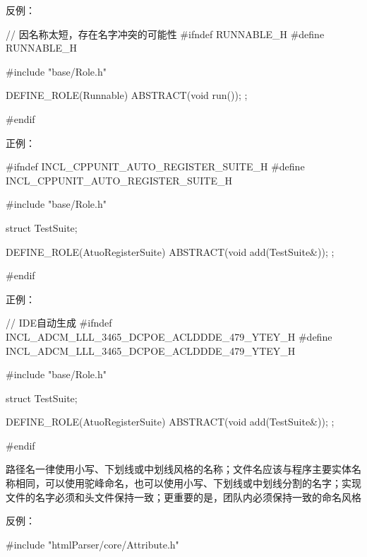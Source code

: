 \begin{content}
反例：
\begin{leftbar}
\begin{c++}[caption={thread/Runnable.h}]
// 因名称太短，存在名字冲突的可能性
#ifndef RUNNABLE_H
#define RUNNABLE_H

#include "base/Role.h"

DEFINE_ROLE(Runnable)
{
    ABSTRACT(void run());
};

#endif
\end{c++}
\end{leftbar}

正例：
\begin{leftbar}
\begin{c++}[caption={cppunit/AutoRegisterSuite.h}]
#ifndef INCL_CPPUNIT_AUTO_REGISTER_SUITE_H
#define INCL_CPPUNIT_AUTO_REGISTER_SUITE_H

#include "base/Role.h"

struct TestSuite;

DEFINE_ROLE(AtuoRegisterSuite)
{
    ABSTRACT(void add(TestSuite&));
};

#endif
\end{c++}
\end{leftbar}

正例：
\begin{leftbar}
\begin{c++}[caption={cppunit/AutoRegisterSuite.h}]
// IDE自动生成
#ifndef INCL_ADCM_LLL_3465_DCPOE_ACLDDDE_479_YTEY_H
#define INCL_ADCM_LLL_3465_DCPOE_ACLDDDE_479_YTEY_H

#include "base/Role.h"

struct TestSuite;

DEFINE_ROLE(AtuoRegisterSuite)
{
    ABSTRACT(void add(TestSuite&));
};

#endif
\end{c++}
\end{leftbar}

\begin{regulation}
路径名一律使用小写、下划线或中划线风格的名称；文件名应该与程序主要实体名称相同，可以使用驼峰命名，也可以使用小写、下划线或中划线分割的名字；实现文件的名字必须和头文件保持一致；更重要的是，团队内必须保持一致的命名风格
\end{regulation}

反例：
\begin{leftbar}
\begin{c++}[caption={路径名\ascii{htmlParser}使用了驼峰命名风格}]
#include "htmlParser/core/Attribute.h"
\end{c++}
\end{leftbar}


\end{content}
